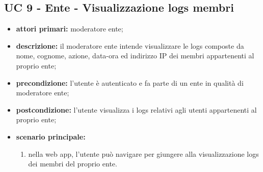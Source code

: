 		\subsection{UC 9 - Ente - Visualizzazione logs membri}
		\begin{itemize}
			\item \textbf{attori primari:} moderatore ente;
			\item \textbf{descrizione:} il moderatore ente intende visualizzare le logs composte da nome, cognome, azione, data-ora ed indirizzo IP dei membri appartenenti al proprio ente;
			\item \textbf{precondizione:} l'utente è autenticato e fa parte di un ente in qualità di moderatore ente;
			\item \textbf{postcondizione:} l'utente visualizza i logs relativi agli utenti appartenenti al proprio ente;
			\item \textbf{scenario principale:}
			\begin{enumerate}
				\item nella web app, l'utente può navigare per giungere alla visualizzazione logs dei membri del proprio ente.
			\end{enumerate}
		\end{itemize}

